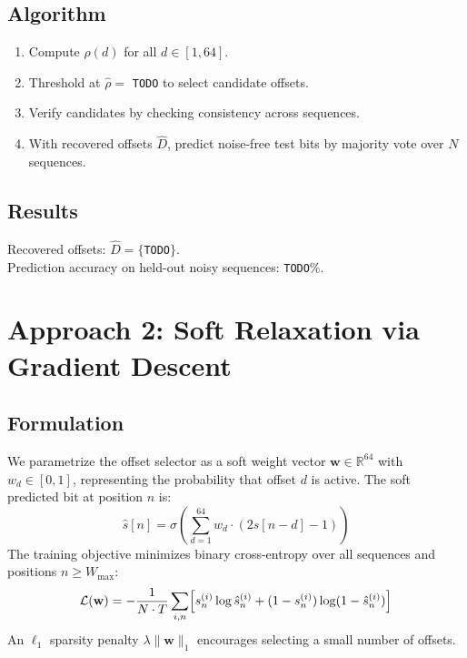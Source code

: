 \documentclass[10pt,twocolumn]{article}
\begin{document}
\subsection{Algorithm}


\begin{enumerate}
  \item Compute $\rho(d)$ for all $d \in [1, 64]$.
  \item Threshold at $\hat{\rho} = $ \texttt{TODO} to select candidate offsets.
  \item Verify candidates by checking consistency across sequences.
  \item With recovered offsets $\hat{D}$, predict noise-free test bits by
        majority vote over $N$ sequences.
\end{enumerate}

\subsection{Results}


Recovered offsets: $\hat{D} = \{$\texttt{TODO}$\}$.\\
Prediction accuracy on held-out noisy sequences: \texttt{TODO}\%.

\section{Approach 2: Soft Relaxation via Gradient Descent}
\label{sec:gd}

\subsection{Formulation}

We parametrize the offset selector as a soft weight vector
$\mathbf{w} \in \mathbb{R}^{64}$ with $w_d \in [0,1]$,
representing the probability that offset $d$ is active.
The soft predicted bit at position $n$ is:
%
\begin{equation}
\hat{s}[n] = \sigma\!\left(\sum_{d=1}^{64} w_d \cdot (2 s[n-d] - 1)\right)
\label{eq:soft}
\end{equation}
%
The training objective minimizes binary cross-entropy over all sequences
and positions $n \ge W_{\max}$:
%
\begin{equation}
\mathcal{L}(\mathbf{w}) = -\frac{1}{N \cdot T}
    \sum_{i,n} \Bigl[ s^{(i)}_n \log \hat{s}^{(i)}_n
    + (1-s^{(i)}_n)\log(1-\hat{s}^{(i)}_n) \Bigr]
\label{eq:loss}
\end{equation}
%
An $\ell_1$ sparsity penalty $\lambda \|\mathbf{w}\|_1$ encourages
selecting a small number of offsets.
\end{document}
